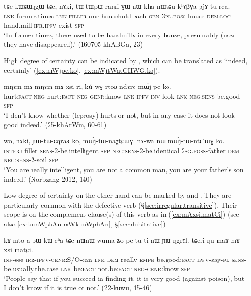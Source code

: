 \begin{exe} 
\ex \label{ex:pjAtu.rca}
\gll  tɕe kɯɕɯŋgɯ tɕe, nɤki, tɯ-tɯpɯ raŋri ɣɯ nɯ-kha nɯtɕu kʰɤβɣa pjɤ-tu rca. \\
\textsc{lnk} former.times \textsc{lnk} \textsc{filler} one-household each \textsc{gen} \textsc{3pl}.\textsc{poss}-house \textsc{dem}:\textsc{loc} hand.mill \textsc{ifr}.\textsc{ipfv}-exist \textsc{sfp} \\
\glt `In former times, there used to be handmills in every house, presumably (now they have disappeared).' (160705 khABGa, 23)
\end{exe} 

High degree of certainty can be indicated by , which can be translated as `indeed, certainly' (\ref{ex:mWjpe.ko}, \ref{ex:mWjtWntCHWG.ko}).
 
\begin{exe} 
\ex \label{ex:mWjpe.ko}
\gll  mŋɤm mɤ-mŋɤm mɤ-xsi ri, kú-wɣ-rtoʁ ndɤre mɯ́j-pe ko. \\
hurt:\textsc{fact} \textsc{neg}-hurt:\textsc{fact} \textsc{neg}-\textsc{genr}:know \textsc{lnk} \textsc{ipfv}-\textsc{inv}-look \textsc{lnk} \textsc{neg}:\textsc{sens}-be.good \textsc{sfp} \\
\glt `I don't know whether (leprosy) hurts or not, but in any case it does not look good indeed.' (25-khArWm, 60-61)
\end{exe} 

\begin{exe} 
\ex \label{ex:mWjtWntCHWG.ko}
\gll wo, nɤki, ɲɯ-tɯ-ɕqraʁ ko, mɯ́j-tɯ-naχtɕɯɣ, nɤ-wa nɯ mɯ́j-tɯ-ntɕʰɯɣ ko. \\
\textsc{interj} filler \textsc{sens}-2-be.intelligent \textsc{sfp} \textsc{neg}:\textsc{sens}-2-be.identical \textsc{2sg}.\textsc{poss}-father \textsc{dem} \textsc{neg}:\textsc{sens}-2-soil \textsc{sfp} \\ 
\glt  `You are really intelligent, you are not a common man, you are your father's son indeed.' (Norbzang 2012, 140)
\end{exe} 

Low degree of certainty on the other hand can be marked by   and . They are particularly common with the defective verb  (§\ref{sec:irregular.transitive}). Their scope is on the complement clause(s) of this verb as in (\ref{ex:mAxsi.matCi}) (see also \ref{ex:kunWphAn.mWkunWphAn}, §\ref{sec:dubitative}). 

\begin{exe} 
\ex \label{ex:mAxsi.matCi}
\gll  kɤ-mto a-pɯ-kɯ-cʰa tɕe nɯnɯ wuma ʑo pe tu-ti-nɯ ɲɯ-ŋgrɤl.
tɕeri ŋu maʁ mɤ-xsi matɕi. \\
\textsc{inf}-see \textsc{irr}-\textsc{ipfv}-\textsc{genr}:S/O-can \textsc{lnk} \textsc{dem} really \textsc{emph} be.good:\textsc{fact} \textsc{ipfv}-say-\textsc{pl} \textsc{sens}-be.usually.the.case \textsc{lnk} be:\textsc{fact} not.be:\textsc{fact} \textsc{neg}-\textsc{genr}:know \textsc{sfp} \\
\glt `People say that if you succeed in finding it, it is very good (against poison), but I don't know if it is true or not.' (22-kuwu, 45-46)
\end{exe} 
 
